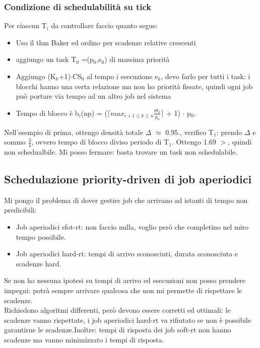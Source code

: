 \documentclass[12pt, oneside]{extbook}
\begin{document}
\subsubsection{Condizione di schedulabilità su tick}
Per ciascun T$_{i}$ da controllare faccio quanto segue:
\begin{itemize}
\item Uso il thm Baker ed ordino per scadenze relative crescenti
\item aggiungo un task T$_{0}$ =(p$_{0}$,e$_{0}$) di massima priorità
\item Aggiungo (K$_{k}$+1)$\cdot$CS$_{0}$ al tempo i esecuzione e$_{k}$, devo farlo per tutti i task: i blocchi hanno una certa relazione ma non ho priorità fissate, quindi ogni job può portare via tempo ad un altro job nel sistema
\item Tempo di blocco è b$_{i}$(np) = ($\lceil max_{i+1 \leq k \leq n}\frac{\Theta_{k}}{p_{0}}\rceil$ + 1) $\cdot$ p$_{0}$.
\end{itemize}
Nell'esempio di prima, ottengo densità totale $\Delta$ $\simeq$ 0.95., verifico T$_{1}$: prendo $\Delta$ e sommo $\frac{3}{4}$, ovvero tempo di blocco diviso periodo di T$_{1}$. Ottengo 1.69 $>$, quindi non schedualbile. Mi posso fermare: basta trovare un task non schedulabile.
\subsection{Schedulazione priority-driven di job aperiodici}
Mi pongo il problema di dover gestire job che arrivano ad istanti di tempo non predicibili:
\begin{itemize}
\item Job aperiodici sfot-rt: non faccio nulla, voglio però che completino nel miro tempo possibile.
\item Job aperiodici hard-rt: tempi di arrivo sconosciuti, durata sconosciuta e scadenze hard.
\end{itemize}
Se non ho nessuna ipotesi su tempi di arrivo ed esecuzioni non posso prendere impegni: potrà sempre arrivare qualcosa che non mi permette di rispettare le scadenze.\\ Richiedono algoritmi differenti, però devono essere corretti ed ottimali: le scadenze vanno rispettate, i job aperiodici hard-rt va rifiutato se non è possibile garantirne le scadenze.Inoltre: tempi di risposta dei job soft-rt non hanno scadenze ma vanno minimizzato i tempi di risposta.
\end{document}
